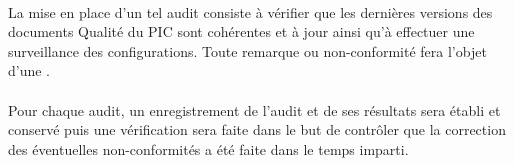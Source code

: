 \paragraph*{} La mise en place d'un tel audit consiste à vérifier que les dernières versions des documents
Qualité du PIC sont cohérentes et à jour ainsi qu'à effectuer une surveillance des configurations.
Toute remarque ou non-conformité fera l'objet d'une \FFTCourt .

\paragraph*{} Pour chaque audit, un enregistrement de l'audit et de ses résultats sera établi et conservé
puis une vérification sera faite dans le but de contrôler que la correction des éventuelles non-conformités a été faite dans le temps imparti.
